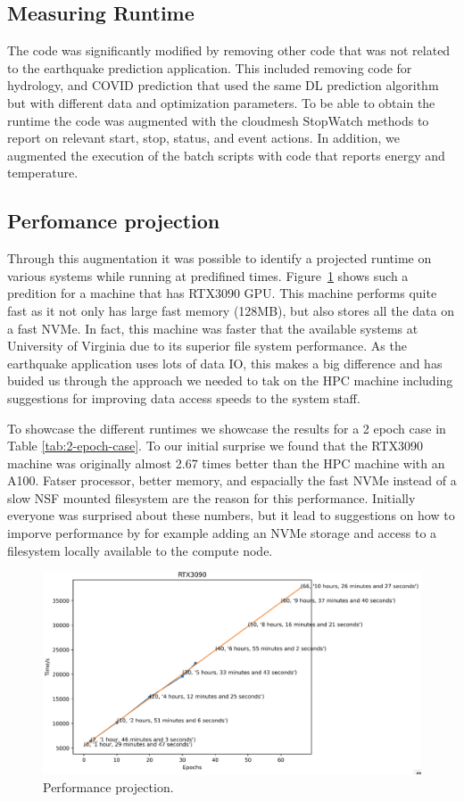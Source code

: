 \documentclass[utf8]{FrontiersinVancouver} %
\begin{document}
\subsection{Measuring Runtime}
\label{sec:perf-runtime}


The code was significantly modified by removing other code that was
not related to the earthquake prediction application. This included
removing code for hydrology, and COVID prediction that used the same
DL prediction algorithm but with different data and optimization
parameters. To be able to obtain the runtime the code was augmented
with the cloudmesh StopWatch methods to report on relevant start,
stop, status, and event actions. In addition, we augmented the
execution of the batch scripts with code that reports energy and
temperature.

\subsection{Perfomance projection}


Through this augmentation it was possible to identify a projected
runtime on various systems while running at predifined
times. Figure~\ref{fig:performance-projection} shows such a predition
for a machine that has RTX3090 GPU. This machine performs quite fast
as it not only has large fast memory (128MB), but also stores all the
data on a fast NVMe. In fact, this machine was faster that the
available systems at University of Virginia due to its superior file
system performance. As the earthquake application uses lots of data
IO, this makes a big difference and has buided us through the approach
we needed to tak on the HPC machine including suggestions for
improving data access speeds to the system staff.

To showcase the different runtimes we showcase the results for a 2
epoch case in Table \ref{tab:2-epoch-case}. To our initial surprise we
found that the RTX3090 machine was originally almost 2.67 times better
than the HPC machine with an A100. Fatser processor, better memory,
and espacially the fast NVMe instead of a slow NSF mounted filesystem
are the reason for this performance. Initially everyone was surprised
about these numbers, but it lead to suggestions on how to imporve
performance by for example adding an NVMe storage and access to a
filesystem locally available to the compute node.


\begin{figure}[htb]
    \centering
    \includegraphics[width=0.70\columnwidth]{images/performance-projection.png}
    \caption{Performance projection. }
    \label{fig:performance-projection}
\end{figure}
\end{document}
